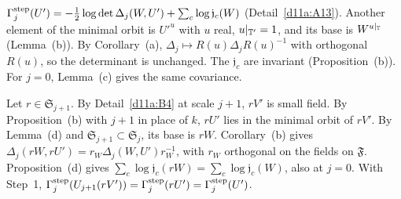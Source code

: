 \begin{detail}\label{d11a:B5}
\begin{step}
$\Gamma^{\rm step}_j(U')=-\frac12\log\det\Delta_j(W,U')+\sum_c\log\mathfrak j_c(W)$ (Detail~\ref{d11a:A13}). Another element of the minimal orbit is $U'^u$ with $u$ real, $u|_{\mathbb T'}=1$, and its base is $W^{u|_\mathbb T}$ (Lemma~(b)). By Corollary~(a), $\Delta_j\mapsto R(u)\Delta_jR(u)^{-1}$ with orthogonal $R(u)$, so the determinant is unchanged. The $\mathfrak j_c$ are invariant (Proposition~(b)). For $j=0$, Lemma~(c) gives the same covariance.
\end{step}
\begin{step}
Let $r\in\mathfrak S_{j+1}$. By Detail~\ref{d11a:B4} at scale $j+1$, $rV'$ is small field. By Proposition~(b) with $j+1$ in place of $k$, $rU'$ lies in the minimal orbit of $rV'$. By Lemma~(d) and $\mathfrak S_{j+1}\subset\mathfrak S_j$, its base is $rW$. Corollary~(b) gives $\Delta_j(rW,rU')=r_W\Delta_j(W,U')r_W^{-1}$, with $r_W$ orthogonal on the fields on $\mathfrak F$. Proposition~(d) gives $\sum_c\log\mathfrak j_c(rW)=\sum_c\log\mathfrak j_c(W)$, also at $j=0$. With Step~1, $\Gamma^{\rm step}_j(U_{j+1}(rV'))=\Gamma^{\rm step}_j(rU')=\Gamma^{\rm step}_j(U')$.
\end{step}
\end{detail}

